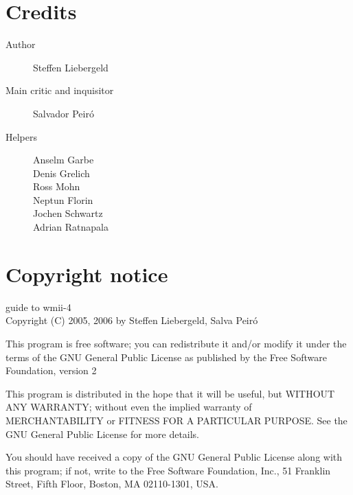 \documentclass[12pt,a4paper]{article} %
\begin{document}
    \newpage

    \section{Credits}
    \label{sec:credits}


    \begin{description}
    \item [Author] Steffen Liebergeld
    \item [Main critic and inquisitor] Salvador Peir\'o

    \item [Helpers]
      Anselm Garbe \\
      Denis Grelich \\
      Ross Mohn \\
      Neptun Florin \\
      Jochen Schwartz \\
      Adrian Ratnapala \\
    \end{description}

    \section{Copyright notice}

    guide to wmii-4\\
    Copyright (C) 2005, 2006 by Steffen Liebergeld, Salva Peir\'o

    This program is free software; you can redistribute it and/or modify
    it under the terms of the GNU General Public License as published by
    the Free Software Foundation, version 2

    This program is distributed in the hope that it will be useful, but
    WITHOUT ANY WARRANTY; without even the implied warranty of
    MERCHANTABILITY or FITNESS FOR A PARTICULAR PURPOSE.  See the GNU
    General Public License for more details.

    You should have received a copy of the GNU General Public License
    along with this program; if not, write to the Free Software
    Foundation, Inc., 51 Franklin Street, Fifth Floor, Boston, MA
    02110-1301, USA.
\end{document}
